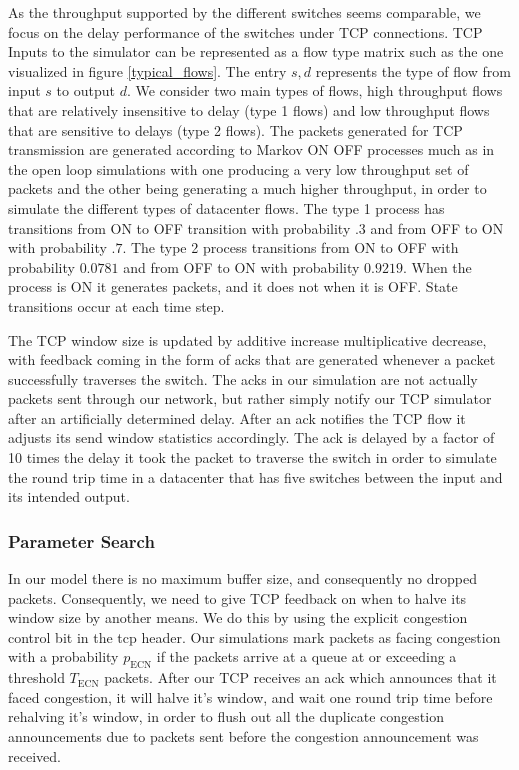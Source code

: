 \documentclass{IEEEtran}%
\begin{document}
As the throughput supported by the different switches seems comparable, we focus on the delay performance of the switches under TCP connections.  TCP Inputs to the simulator can be represented as a flow type matrix such as the one visualized in figure \ref{typical_flows}.  The entry $s,d$ represents the type of flow from input $s$ to output $d$.  We consider two main types of flows, high throughput flows that are relatively insensitive to delay (type 1 flows) and low throughput flows that are sensitive to delays (type 2 flows).  The packets generated for TCP transmission are generated according to Markov ON OFF processes much as in the open loop simulations with one producing a very low throughput set of packets and the other being generating a much higher throughput, in order to simulate the different types of datacenter flows.  The type 1 process has transitions from ON to OFF transition with probability $.3$ and from OFF to ON with probability $.7$.  The type 2 process transitions from ON to OFF with probability $0.0781$ and from OFF to ON with probability $0.9219$.  When the process is ON it generates packets, and it does not when it is OFF.   State transitions occur at each time step.

The TCP window size is updated by additive increase multiplicative decrease, with feedback coming in the form of acks that are generated whenever a packet successfully traverses the switch.  The acks in our simulation are not actually packets sent through our network, but rather simply notify our TCP simulator after an artificially determined delay.  After an ack notifies the TCP flow it adjusts its send window statistics accordingly.  The ack is delayed by a factor of 10 times the delay it took the packet to traverse the switch in order to simulate the round trip time in a datacenter that has five switches between the input and its intended output.\\


\subsubsection{Parameter Search}

In our model there is no maximum buffer size, and consequently no dropped packets.  Consequently, we need to give TCP feedback on when to halve its window size by another means.  We do this by using the explicit congestion control bit in the tcp header.  Our simulations mark packets as facing congestion with a probability $p_{\text{ECN}}$ if the packets arrive at a queue at or exceeding a threshold $T_{\text{ECN}}$ packets.  After our TCP receives an ack which announces that it faced congestion, it will halve it's window, and wait one round trip time before rehalving it's window, in order to flush out all the duplicate congestion announcements due to packets sent before the congestion announcement was received.
\end{document}
